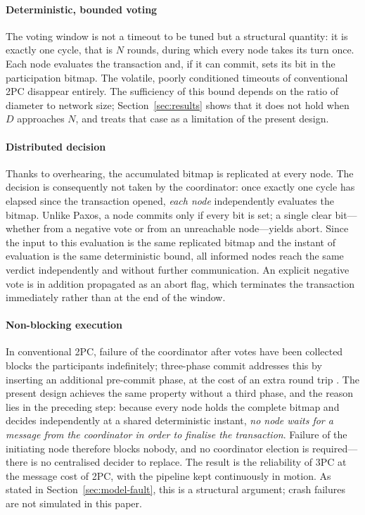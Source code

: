 \documentclass[journal]{IEEEtran}
\newcommand{\Nnodes}{N}                   %
\newcommand{\Diam}{D}                     %
\begin{document}
\paragraph{Deterministic, bounded voting}
The voting window is not a timeout to be tuned but a structural quantity:
it is exactly one cycle, that is $\Nnodes$ rounds, during which every node
takes its turn once. Each node evaluates the transaction and, if it can
commit, sets its bit in the participation bitmap. The volatile, poorly
conditioned timeouts of conventional 2PC disappear entirely. The
sufficiency of this bound depends on the ratio of diameter to network
size; Section~\ref{sec:results} shows that it does not hold when $\Diam$
approaches $\Nnodes$, and treats that case as a limitation of the present
design.

\paragraph{Distributed decision}
Thanks to overhearing, the accumulated bitmap is replicated at every node.
The decision is consequently not taken by the coordinator: once exactly
one cycle has elapsed since the transaction opened, \emph{each node}
independently evaluates the bitmap. Unlike Paxos, a node commits only if
every bit is set; a single clear bit---whether from a negative vote or
from an unreachable node---yields abort. Since the input to this
evaluation is the same replicated bitmap and the instant of evaluation is
the same deterministic bound, all informed nodes reach the same verdict
independently and without further communication. An explicit negative vote
is in addition propagated as an abort flag, which terminates the
transaction immediately rather than at the end of the window.

\paragraph{Non-blocking execution}
In conventional 2PC, failure of the coordinator after votes have been
collected blocks the participants indefinitely; three-phase commit
addresses this by inserting an additional pre-commit phase, at the cost of
an extra round trip \cite{skeen81nonblocking}. The present design achieves
the same property without a third phase, and the reason lies in the
preceding step: because every node holds the complete bitmap and decides
independently at a shared deterministic instant, \emph{no node waits for a
message from the coordinator in order to finalise the transaction}.
Failure of the initiating node therefore blocks nobody, and no
coordinator election is required---there is no centralised decider to
replace. The result is the reliability of 3PC at the message cost of 2PC,
with the pipeline kept continuously in motion. As stated in
Section~\ref{sec:model-fault}, this is a structural argument; crash
failures are not simulated in this paper.
\end{document}
